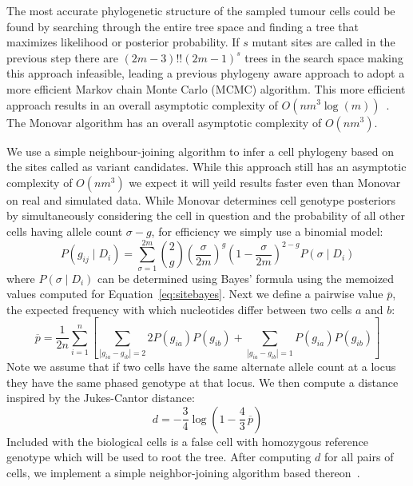 \documentclass[../../main.tex]{subfiles}
\begin{document}
The most accurate phylogenetic structure of the sampled tumour cells could be found by searching through the entire tree space and finding a tree that maximizes likelihood or posterior probability. If $s$ mutant sites are called in the previous step there are $(2m-3)!!(2m-1)^s$ trees in the search space making this approach infeasible, leading a previous phylogeny aware approach to adopt a more efficient Markov chain Monte Carlo (MCMC) algorithm. This more efficient approach results in an overall asymptotic complexity of $O(nm^3\log(m))$~\cite{sciphi}. The Monovar algorithm has an overall asymptotic complexity of $O(nm^3)$.

We use a simple neighbour-joining algorithm to infer a cell phylogeny based on the sites called as variant candidates. While this approach still has an asymptotic complexity of $O(nm^3)$ we expect it will yeild results faster even than Monovar on real and simulated data.
While Monovar determines cell genotype posteriors by simultaneously considering the cell in question and the probability of all other cells having allele count $\sigma-g$, for efficiency we simply use a binomial model:
\begin{equation*}
P(g_{ij}\mid D_i) = \sum_{\sigma=1}^{2m}\binom{2}{g}\left(\frac{\sigma}{2m}\right)^g\left(1-\frac{\sigma}{2m}\right)^{2-g}P(\sigma\mid D_i)
\end{equation*}
where $P(\sigma\mid D_i)$ can be determined using Bayes' formula using the memoized values computed for Equation~\ref{eq:sitebayes}. Next we define a pairwise value $\overline{p}$, the expected frequency with which nucleotides differ between two cells $a$ and $b$:
\begin{equation*}
\overline{p} = \frac{1}{2n}\sum_{i=1}^n\left[ \sum_{|g_{ia}-g_{ib}|=2} 2P(g_{ia})P(g_{ib}) + \sum_{|g_{ia}-g_{ib}|=1} P(g_{ia})P(g_{ib})\right]
\end{equation*}
Note we assume that if two cells have the same alternate allele count at a locus they have the same phased genotype at that locus. We then compute a distance inspired by the Jukes-Cantor distance:
\begin{equation}
d = -\frac{3}{4}\log \left(1-\frac{4}{3}\,\overline{p}\right)
\end{equation}
Included with the biological cells is a false cell with homozygous reference genotype which will be used to root the tree. After computing $d$ for all pairs of cells, we implement a simple neighbor-joining algorithm based thereon~\cite{BSA}.
\end{document}
